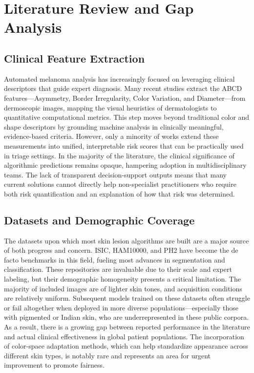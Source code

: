\documentclass[conference]{IEEEtran}
\begin{document}
\section{Literature Review and Gap Analysis}

\subsection{Clinical Feature Extraction}
Automated melanoma analysis has increasingly focused on leveraging clinical descriptors that guide expert diagnosis. Many recent studies extract the ABCD features—Asymmetry, Border Irregularity, Color Variation, and Diameter—from dermoscopic images, mapping the visual heuristics of dermatologists to quantitative computational metrics. This step moves beyond traditional color and shape descriptors by grounding machine analysis in clinically meaningful, evidence-based criteria. However, only a minority of works extend these measurements into unified, interpretable risk scores that can be practically used in triage settings. In the majority of the literature, the clinical significance of algorithmic predictions remains opaque, hampering adoption in multidisciplinary teams. The lack of transparent decision-support outputs means that many current solutions cannot directly help non-specialist practitioners who require both risk quantification and an explanation of how that risk was determined.

\subsection{Datasets and Demographic Coverage}
The datasets upon which most skin lesion algorithms are built are a major source of both progress and concern. ISIC, HAM10000, and PH2 have become the de facto benchmarks in this field, fueling most advances in segmentation and classification. These repositories are invaluable due to their scale and expert labeling, but their demographic homogeneity presents a critical limitation. The majority of included images are of lighter skin tones, and acquisition conditions are relatively uniform. Subsequent models trained on these datasets often struggle or fail altogether when deployed in more diverse populations—especially those with pigmented or Indian skin, who are underrepresented in these public corpora. As a result, there is a growing gap between reported performance in the literature and actual clinical effectiveness in global patient populations. The incorporation of color-space adaptation methods, which can help standardize appearance across different skin types, is notably rare and represents an area for urgent improvement to promote fairness.
\end{document}
